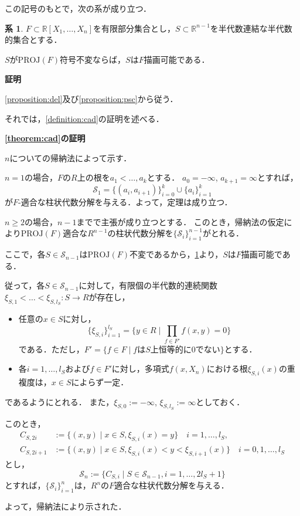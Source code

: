 \documentclass[uplatex, dvipdfmx]{jsarticle}
\makeatletter
\renewenvironment{proof}[1][\proofname]{\par
  \pushQED{\qed}%
  \normalfont \topsep6\p@\@plus6\p@\relax
  \trivlist
  \item\relax
  {\bfseries
  #1\@addpunct{.}}\hspace\labelsep\ignorespaces
}{%
  \popQED\endtrivlist\@endpefalse
}
\newcommand{\R}{\mathbb{R}}
\newcommand{\calS}{\mathcal{S}}
\newcommand{\PROJ}{\mathrm{PROJ}}
\newcommand{\map}[3]{{#1}:{#2}\rightarrow{#3}}
\theoremstyle{definition}
\newtheorem{corollary}{系}[section]
\renewcommand{\proofname}{\textbf{証明}}
\makeatother
\begin{document}
この記号のもとで，次の系が成り立つ．

\begin{corollary}\label{corollary:inv-deline}
$F \subset \R[X_1, \dots, X_n]$を有限部分集合とし，$S \subset \R^{n-1}$を半代数連結な半代数的集合とする．

$S$が$\PROJ(F)$符号不変ならば，$S$は$F$描画可能である．
\end{corollary}

\begin{proof}
\cref{proposition:del}及び\cref{proposition:psc}から従う．
\end{proof}

それでは，\cref{definition:cad}の証明を述べる．

\begin{proof}[\cref{theorem:cad}の証明]
     $n$についての帰納法によって示す．

     $n=1$の場合，$F$の$R$上の根を$a_1 < \dots, a_k$とする．
     $a_0 = -\infty$, $a_{k+1} = \infty$とすれば，
     \[
          \calS_1 = \{(a_i, a_{i+1})\}_{i=0}^k \cup \{a_i\}_{i=1}^k
     \]
     が$F$-適合な柱状代数分解を与える．よって，定理は成り立つ．

     $n\geq 2$の場合，$n-1$までで主張が成り立つとする．
     このとき，帰納法の仮定により$\PROJ(F)$適合な$R^{n-1}$の柱状代数分解を$\{\calS_i\}_{i=1}^{n-1}$がとれる．

     ここで，各$S \in \calS_{n-1}$は$\PROJ(F)$不変であるから，\cref{corollary:inv-deline}より，$S$は$F$描画可能である．

     従って，各$S \in \calS_{n-1}$に対して，有限個の半代数的連続関数$\map{\xi_{S,1}< \dots < \xi_{S,l_S}}{S}{R}$が存在し，
     \begin{itemize}
          \item 任意の$ x \in S $に対し，
          \[
               \{\xi_{S,i}\}_{i=1}^{l_S} = \{y \in R \mid \prod_{f \in F'}f(x,y)=0\}
          \]
          である．ただし，$F' = \{f \in F \mid \text{$f$は$S$上恒等的に0でない}\}$とする．
          \item 各$i=1, \dots, l_S$および$f \in F'$に対し，多項式$f(x,X_n)$における根$\xi_{S,i}(x)$の重複度は，$x\in S$によらず一定．
     \end{itemize}
     であるようにとれる．
     また，$\xi_{S,0} := -\infty$, $\xi_{S,l_S} := \infty$としておく．

     このとき，
     \begin{align*}
          C_{S,2i} &:= \{(x,y) \mid  x \in S, \xi_{S,i}(x) = y \} \quad i = 1,\dots, l_S,\\
          C_{S,2i+1} &:= \{(x,y) \mid x \in S, \xi_{S,i}(x)<y<\xi_{S,i+1}(x) \} \quad i = 0,1, \dots, l_S 
     \end{align*}
     とし，
     \[
          \calS_n := \{C_{S,i} \mid S \in \calS_{n-1}, i=1, \dots, 2l_S+1\}
     \]
     とすれば，$\{\calS_i\}_{i=1}^n$は，$R^n$の$F$適合な柱状代数分解を与える．

     よって，帰納法により示された．
\end{proof}
\end{document}
